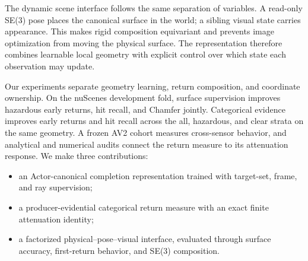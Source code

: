 The dynamic scene interface follows the same separation of variables. A read-only SE(3) pose places the canonical
surface in the world; a sibling visual state carries appearance. This makes rigid composition equivariant and
prevents image optimization from moving the physical surface. The representation therefore combines learnable
local geometry with explicit control over which state each observation may update.

Our experiments separate geometry learning, return composition, and coordinate ownership. On the nuScenes
development fold, surface supervision improves hazardous early returns, hit recall, and Chamfer jointly.
Categorical evidence improves early returns and hit recall across the all, hazardous, and clear strata on
the same geometry. A frozen AV2 cohort measures cross-sensor behavior, and analytical and numerical audits
connect the return measure to its attenuation response. We make three contributions:
\begin{itemize}
\item an Actor-canonical completion representation trained with target-set, frame, and ray supervision;
\item a producer-evidential categorical return measure with an exact finite attenuation identity;
\item a factorized physical--pose--visual interface, evaluated through surface accuracy, first-return behavior,
and SE(3) composition.
\end{itemize}
